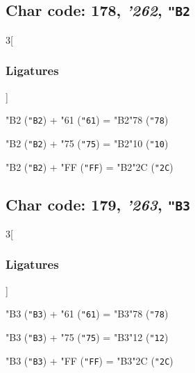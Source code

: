\documentclass{article}
\newlength{\maxcharwidth}
\begin{document}
\subsection{Char code: 178, {\it'262}, {\tt"B2}}
\label{char_178}


\begin{multicols}{3}[\subsubsection{Ligatures}]

{\testfont\char"B2\noboundary} ({\tt"B2}) + {\testfont\char"61\noboundary} ({\tt"61}) = {\testfont\char"B2\noboundary}{\testfont\char"78\noboundary} ({\tt"78}) 

{\testfont\char"B2\noboundary} ({\tt"B2}) + {\testfont\char"75\noboundary} ({\tt"75}) = {\testfont\char"B2\noboundary}{\testfont\char"10\noboundary} ({\tt"10}) 

{\testfont\char"B2\noboundary} ({\tt"B2}) + {\testfont\char"FF\noboundary} ({\tt"FF}) = {\testfont\char"B2\noboundary}{\testfont\char"2C\noboundary} ({\tt"2C}) 

\end{multicols}

\subsection{Char code: 179, {\it'263}, {\tt"B3}}
\label{char_179}


\begin{multicols}{3}[\subsubsection{Ligatures}]

{\testfont\char"B3\noboundary} ({\tt"B3}) + {\testfont\char"61\noboundary} ({\tt"61}) = {\testfont\char"B3\noboundary}{\testfont\char"78\noboundary} ({\tt"78}) 

{\testfont\char"B3\noboundary} ({\tt"B3}) + {\testfont\char"75\noboundary} ({\tt"75}) = {\testfont\char"B3\noboundary}{\testfont\char"12\noboundary} ({\tt"12}) 

{\testfont\char"B3\noboundary} ({\tt"B3}) + {\testfont\char"FF\noboundary} ({\tt"FF}) = {\testfont\char"B3\noboundary}{\testfont\char"2C\noboundary} ({\tt"2C}) 

\end{multicols}
\end{document}
